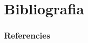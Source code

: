 \section{Bibliografia}
\begin{frame}[allowframebreaks]
        \frametitle{Referencies}
        
        
\end{frame}
